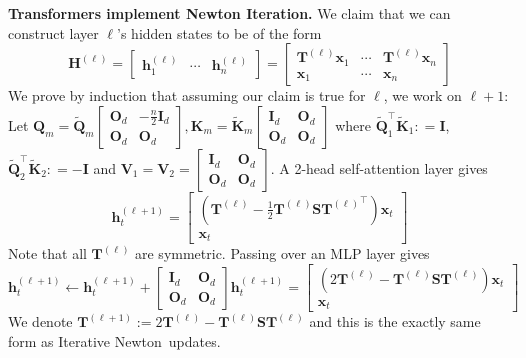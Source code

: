 \documentclass[11pt]{article}
\theoremstyle{plain}
\theoremstyle{definition}
\theoremstyle{remark}
\renewcommand{\^}[1]{^{(#1)}}
\newcommand{\bx}{\boldsymbol{x}}
\newcommand{\bh}{\boldsymbol{h}}
\newcommand{\bK}{\boldsymbol{K}}
\newcommand{\bO}{\boldsymbol{O}}
\newcommand{\bH}{\boldsymbol{H}}
\newcommand{\bQ}{\boldsymbol{Q}}
\newcommand{\bI}{\boldsymbol{I}}
\newcommand{\bS}{\boldsymbol{S}}
\newcommand{\bT}{\boldsymbol{T}}
\newcommand{\bV}{\boldsymbol{V}}
\newcommand{\newton}{Iterative Newton}
\renewcommand{\paragraph}[1]{\vspace{1mm}\noindent\textbf{#1}}
\begin{document}
\paragraph{Transformers implement Newton Iteration.}  We claim that we can construct  layer $\ell$'s hidden states to be of the form 
    \begin{equation}
        \bH^{(\ell)} = \begin{bmatrix}
            \bh_1^{(\ell)} & \cdots & \bh_n^{(\ell)}
        \end{bmatrix} = \begin{bmatrix}
            \bT^{(\ell)} \bx_1 & \cdots & \bT^{(\ell)} \bx_n \\
            \bx_1 & \cdots & \bx_n
        \end{bmatrix} 
    \end{equation}
    We prove by induction that assuming our claim is true for $\ell$, we work on $\ell + 1$:
Let $\bQ_m = \tilde{\bQ}_m \begin{bmatrix}
        \bO_d & -\frac{n}{2} \bI_d \\
        \bO_d & \bO_d 
    \end{bmatrix} , \bK_m = \tilde{\bK}_m \begin{bmatrix}
        \bI_d & \bO_d \\
        \bO_d & \bO_d 
    \end{bmatrix}$ where $\tilde{\bQ}_1^\top \tilde{\bK}_1 : = \bI$, $\tilde{\bQ}_2^\top \tilde{\bK}_2 : = -\bI$ and $\bV_1 = \bV_2 = \begin{bmatrix}
        \bI_d & \bO_d \\
        \bO_d & \bO_d 
    \end{bmatrix}$. A 2-head self-attention layer gives 
\begin{equation}
    \bh_t^{(\ell+1)} = \begin{bmatrix}
        \left(\bT^{(\ell)} - \frac{1}{2} \bT^{(\ell)} \bS {\bT^{(\ell)}}^\top \right) \bx_t \\ \bx_t 
    \end{bmatrix}
\end{equation}
Note that all $\bT^{(\ell)}$ are symmetric. Passing over an MLP layer gives
    \begin{equation}
        \bh_t^{(\ell+1)} \leftarrow \bh_t^{(\ell+1)} + \begin{bmatrix}
            \bI_d & \bO_d \\ 
            \bO_d & \bO_d 
        \end{bmatrix} \bh_t^{(\ell+1)} = \begin{bmatrix}
        \left(2\bT^{(\ell)} -  \bT^{(\ell)} \bS {\bT^{(\ell)}} \right) \bx_t \\ \bx_t 
    \end{bmatrix}
    \end{equation}
We denote $\bT^{(\ell+1)} := 2\bT^{(\ell)} -  \bT^{(\ell)} \bS {\bT^{(\ell)}}$ and this is the exactly same form as \newton\ updates. 
\end{document}
